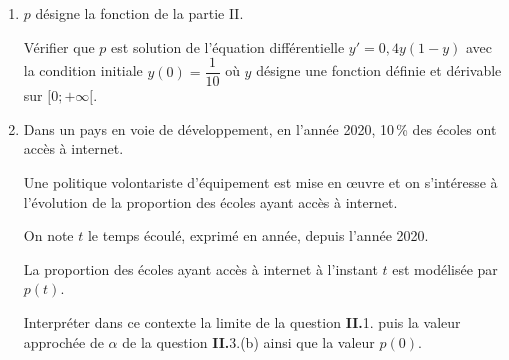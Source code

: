 \begin{enumerate}
	\item $p$ désigne la fonction de la partie II.
	
	Vérifier que $p$ est solution de l'équation différentielle $y' = 0,4y(1 - y)$ avec la condition initiale \mbox{$y(0) = \dfrac{1}{10}$} où $y$ désigne une fonction définie et dérivable sur $[0; + \infty[$.
	\item Dans un pays en voie de développement, en l'année 2020, 10\,\% des écoles ont accès à internet. 
	
	Une politique volontariste d'équipement est mise en œuvre et on s'intéresse à l'évolution de la proportion des écoles ayant accès à internet. 
	
	On note $t$ le temps écoulé, exprimé en année, depuis l'année 2020.
	
	La proportion des écoles ayant accès à internet à l'instant $t$ est modélisée par $p(t)$.
	
	Interpréter dans ce contexte la limite de la question \textbf{II.}1. puis la valeur approchée de $\alpha$ de la question \textbf{II.}3.(b) ainsi que la valeur $p(0)$.
\end{enumerate}